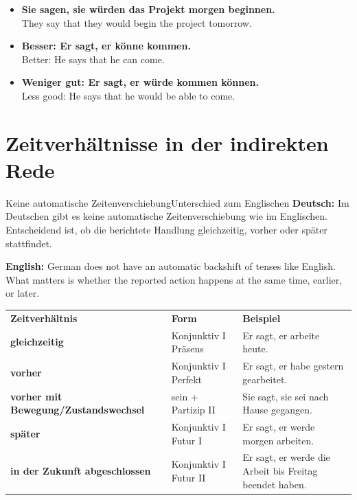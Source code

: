 \documentclass[a4paper,11pt]{article}
\newcommand{\GermanText}[1]{\textbf{Deutsch: }#1\par}
\newcommand{\EnglishText}[1]{{\small\color{SoftGray}\textbf{English: }#1\par}}
\newcommand{\ExampleItem}[2]{\item \textbf{#1}\\{\small\color{SoftGray}#2}}
\begin{document}
        \begin{exbox}
            \begin{itemize}
                \ExampleItem{Sie sagen, sie würden das Projekt morgen beginnen.}{They say that they would begin the project tomorrow.}
                \ExampleItem{Besser: Er sagt, er könne kommen.}{Better: He says that he can come.}
                \ExampleItem{Weniger gut: Er sagt, er würde kommen können.}{Less good: He says that he would be able to come.}
            \end{itemize}
        \end{exbox}


    \section{Zeitverhältnisse in der indirekten Rede}

        \begin{grammarentry}{Keine automatische Zeitenverschiebung}{Unterschied zum Englischen}
            \GermanText{Im Deutschen gibt es keine automatische Zeitenverschiebung wie im Englischen. Entscheidend ist, ob die berichtete Handlung gleichzeitig, vorher oder später stattfindet.}
            \EnglishText{German does not have an automatic backshift of tenses like English. What matters is whether the reported action happens at the same time, earlier, or later.}
        \end{grammarentry}

        \begin{longtable}{>{\bfseries}p{3.3cm}|p{4.3cm}|p{6.4cm}}
            \rowcolor{HeaderBlueDark}
            \color{white}\textbf{Zeitverhältnis} &
            \color{white}\textbf{Form} &
            \color{white}\textbf{Beispiel} \\
            gleichzeitig & Konjunktiv I Präsens & Er sagt, er arbeite heute. \\
            vorher & Konjunktiv I Perfekt & Er sagt, er habe gestern gearbeitet. \\
            vorher mit Bewegung/Zustandswechsel & sein + Partizip II & Sie sagt, sie sei nach Hause gegangen. \\
            später & Konjunktiv I Futur I & Er sagt, er werde morgen arbeiten. \\
            in der Zukunft abgeschlossen & Konjunktiv I Futur II & Er sagt, er werde die Arbeit bis Freitag beendet haben. \\
        \end{longtable}
\end{document}
